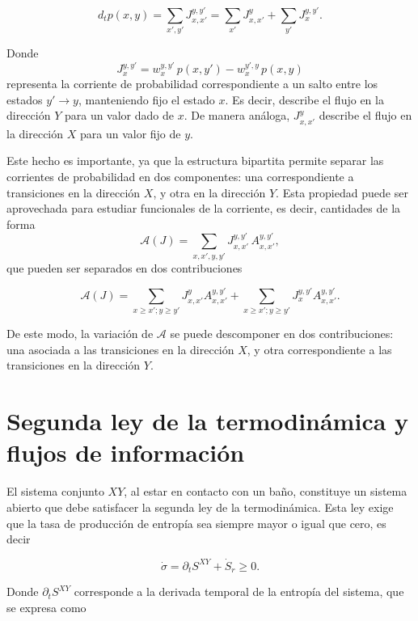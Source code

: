 \begin{equation*}
    d_{t}p(x,y) = \sum_{x',y'}J_{x,x'}^{y,y'} = \sum_{x'}J_{x,x'}^{y} + \sum_{y'}J_{x}^{y,y'}.
\end{equation*}

Donde  
\[
J_{x}^{y,y'} = w_{x}^{y,y'}\,p(x,y') - w_{x}^{y',y}\,p(x,y)
\]
representa la corriente de probabilidad correspondiente a un salto entre los estados \( y' \to y \), manteniendo fijo el estado \( x \). Es decir, describe el flujo en la dirección \( Y \) para un valor dado de \( x \). De manera análoga, $J^{y}_{x,x'}$ describe el flujo en la dirección \( X\) para un valor fijo de \(y\).  

Este hecho es importante, ya que la estructura bipartita permite separar las corrientes de probabilidad en dos componentes: una correspondiente a transiciones en la dirección \( X \), y otra en la dirección \( Y \). Esta propiedad puede ser aprovechada para estudiar funcionales de la corriente, es decir, cantidades de la forma
\[
\mathcal{A}(J) = \sum_{x,x',y,y'} J_{x,x'}^{y,y'}\, A_{x,x'}^{y,y'},
\]
que pueden ser separados en dos contribuciones

\begin{equation}
    \mathcal{A}(J) = \sum_{x\geq x';y \geq y'} J_{x,x'}^{y}A_{x,x'}^{y,y'} + \sum_{x \geq x'; y \geq y'}J_{x}^{y,y'} A_{x,x'}^{y,y'}.
\label{sec4:functionalcurrent}
\end{equation}

De este modo, la variación de \( \mathcal{A} \) se puede descomponer en dos contribuciones: una asociada a las transiciones en la dirección \( X \), y otra correspondiente a las transiciones en la dirección \( Y \).


\label{sec4:flujos}
\section{Segunda ley de la termodinámica y flujos de información}
El sistema conjunto \( XY \), al estar en contacto con un baño, constituye un sistema abierto que debe satisfacer la segunda ley de la termodinámica. Esta ley exige que la tasa de producción de entropía sea siempre mayor o igual que cero, es decir 

\begin{equation*}
    \dot{\sigma} = \partial_{t}S^{XY} + \dot{S}_{r} \geq 0. 
\end{equation*}

Donde $\partial_{t}S^{XY}$ corresponde a la derivada temporal de la entropía del sistema, que se expresa como  

